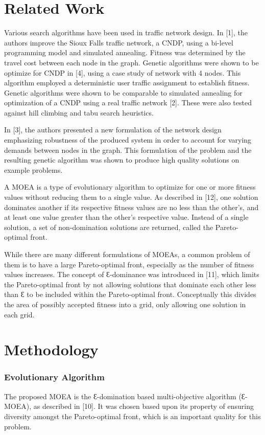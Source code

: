\documentclass[11pt, oneside, notitlepage, draft]{article}
\begin{document}
\part{Related Work}
    Various search algorithms have been used in traffic network design.  In [1], the authors improve the Sioux Falls traffic network, a CNDP, using a bi-level programming model and simulated annealing. Fitness was determined by the travel cost between each node in the graph. Genetic algorithms were shown to be optimize for CNDP in [4], using a case study of network with 4 nodes. This algorithm employed a deterministic user traffic assignment to establish fitness.  Genetic algorithms were shown to be comparable to simulated annealing for optimization of a CNDP using a real traffic network [2]. These were also tested against hill climbing and tabu search heuristics.

    In [3], the authors presented a new formulation of the network design emphasizing robustness of the produced system in order to account for varying demands between nodes in the graph. This formulation of the problem and the resulting genetic algorithm was shown to produce high quality solutions on example problems.

    A MOEA is a type of evolutionary algorithm to optimize for one or more fitness values without reducing them to a single value. As described in [12], one solution dominates another if its respective fitness values are no less than the other's, and at least one value greater than the other's respective value. Instead of a single solution, a set of non-domination solutions are returned, called the Pareto-optimal front.

    While there are many different formulations of MOEAs, a common problem of them is to have a large Pareto-optimal front, especially as the number of fitness values increases. The concept of  Ɛ-dominance was introduced in [11], which limits the Pareto-optimal front by not allowing solutions that dominate each other less than Ɛ to be included within the Pareto-optimal front. Conceptually this divides the area of possibly accepted fitness into a grid, only allowing one solution in each grid.
\part{Methodology}
    \section{Evolutionary Algorithm}
        The proposed MOEA is the Ɛ-domination based multi-objective algorithm (Ɛ-MOEA), as described in [10]. It was chosen based upon its property of ensuring diversity amongst the Pareto-optimal front, which is an important quality for this problem.
\end{document}
